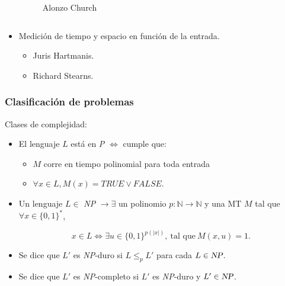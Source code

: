 \begin{frame}
\begin{itemize}
\begin{columns}
\begin{figure}
\caption{Alonzo Church}
\end{figure}
\end{columns}
\pause
\item Medición de tiempo y espacio en función de la entrada.
\begin{itemize}
\item Juris Hartmanis.
\item Richard Stearns.
\end{itemize}
\end{itemize}
\end{frame}



\begin{frame}
\frametitle{Clasificación de problemas}
Clases de complejidad:
\begin{itemize}
\item El lenguaje $L$ está en \textsl{P} $\Leftrightarrow$ cumple que: 
\begin{itemize}
\item $M$ corre en tiempo polinomial para toda entrada
\item $\forall x \in L, M(x) = TRUE \lor FALSE$.
\end{itemize}
\pause
\item Un lenguaje $L \in $ \textsl{NP} $\rightarrow \exists$ un
  polinomio $p: \mathbb{N} \longrightarrow \mathbb{N}$ y una MT $M$ 
  tal que $\forall x \in \{0,1\}^{*}$, 
  
  \begin{displaymath}
    x \in L \Leftrightarrow \exists u \in \{0,1\}^{p(|x|)},~
    \textrm{tal que} ~ M(x,u) = 1.
  \end{displaymath}
  \pause
\item Se dice que $L'$ es \textsl{NP}-duro si
  $L \leq_{p} L'$ para cada $L \in \textsl{NP} $.
  \pause
\item  Se dice que $L'$ es \textsl{NP}-completo si $L'$ es \textsl{NP}-duro y
  $L' \in \textsl{NP}$.
\end{itemize}

\end{frame}